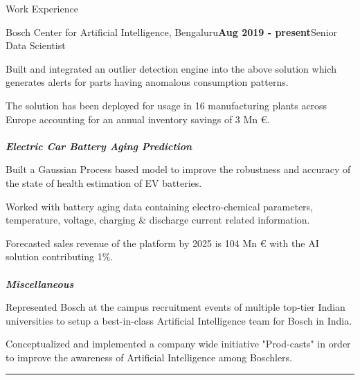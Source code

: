 \documentclass{resume}
\begin{document}
\begin{rSection}{Work Experience}
\begin{rSubsection}{Bosch Center for Artificial Intelligence, Bengaluru}{\textbf{Aug 2019 - present}}{Senior Data Scientist}{}
  \item Built and integrated an outlier detection engine into the above solution which generates alerts for parts having anomalous consumption patterns.
 \item The solution has been deployed for usage in 16 manufacturing plants across Europe accounting for an annual inventory savings of 3 Mn \euro{}.\\\\
{\textbf{\textit{Electric Car Battery Aging Prediction}}}
 \item Built a Gaussian Process based model to improve the robustness and accuracy of the state of health estimation of EV batteries.
 \item Worked with battery aging data containing electro-chemical parameters, temperature, voltage, charging \& discharge current related information.
 \item Forecasted sales revenue of the platform by 2025 is 104 Mn \euro{} with the AI solution contributing 1\%.\\\\
{\textbf{\textit{Miscellaneous}}}
 \item Represented Bosch at the campus recruitment events of multiple top-tier Indian universities to setup a best-in-class Artificial Intelligence team for Bosch in India.
 \item Conceptualized and implemented a company wide initiative "Prod-casts" in order to improve the awareness of Artificial Intelligence among Boschlers.\\
 \noindent\rule{6.75in}{0.1pt}
\end{rSubsection}


\end{rSection}
\end{document}
